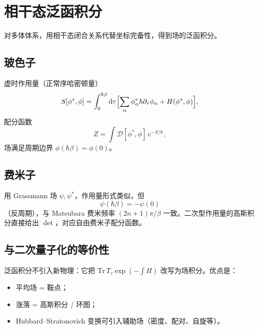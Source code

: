 \section{相干态泛函积分}

对多体体系，用相干态闭合关系代替坐标完备性，得到场的泛函积分。

\subsection{玻色子}

虚时作用量（正常序哈密顿量）
\begin{equation}
  S[\phi^*,\phi]
  =\int_0^{\hbar\beta}\mathrm{d}\tau
  \Bigl[
  \sum_\alpha\phi_\alpha^*\hbar\partial_\tau\phi_\alpha
  +H(\phi^*,\phi)
  \Bigr],
\end{equation}
配分函数
\begin{equation}
  Z
  =\int\mathcal{D}[\phi^*,\phi]\,
  e^{-S/\hbar},
\end{equation}
场满足周期边界 $\phi(\hbar\beta)=\phi(0)$。

\subsection{费米子}

用 Grassmann 场 $\psi,\psi^*$，作用量形式类似，但
\begin{equation}
  \psi(\hbar\beta)=-\psi(0)
\end{equation}
（反周期），与 Matsubara 费米频率 $(2n+1)\pi/\beta$ 一致。二次型作用量的高斯积分直接给出 $\det$，对应自由费米子配分函数。

\subsection{与二次量子化的等价性}

泛函积分不引入新物理：它把 $\mathrm{Tr}\,T_\tau\exp(-\int H)$ 改写为场积分。优点是：
\begin{itemize}
  \item 平均场 = 鞍点；
  \item 涨落 = 高斯积分 / 环图；
  \item Hubbard--Stratonovich 变换可引入辅助场（密度、配对、自旋等）。
\end{itemize}
